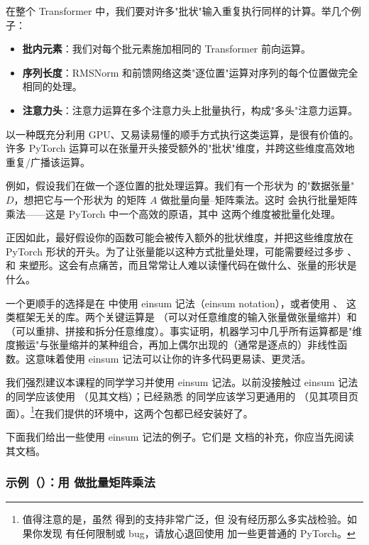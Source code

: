 在整个 Transformer 中，我们要对许多"批状"输入重复执行同样的计算。举几个例子：

\begin{itemize}
  \item \textbf{批内元素}：我们对每个批元素施加相同的 Transformer 前向运算。
  \item \textbf{序列长度}：RMSNorm 和前馈网络这类"逐位置"运算对序列的每个位置做完全相同的处理。
  \item \textbf{注意力头}：注意力运算在多个注意力头上批量执行，构成"多头"注意力运算。
\end{itemize}

以一种既充分利用 GPU、又易读易懂的顺手方式执行这类运算，是很有价值的。许多 PyTorch 运算可以在张量开头接受额外的"批状"维度，并跨这些维度高效地重复/广播该运算。

例如，假设我们在做一个逐位置的批处理运算。我们有一个形状为  的"数据张量" $D$，想把它与一个形状为  的矩阵 $A$ 做批量向量--矩阵乘法。这时  会执行批量矩阵乘法——这是 PyTorch 中一个高效的原语，其中  这两个维度被批量化处理。

正因如此，最好假设你的函数可能会被传入额外的批状维度，并把这些维度放在 PyTorch 形状的开头。为了让张量能以这种方式批量处理，可能需要经过多步 、 和  来塑形。这会有点痛苦，而且常常让人难以读懂代码在做什么、张量的形状是什么。

一个更顺手的选择是在  中使用 einsum 记法（einsum notation），或者使用 、 这类框架无关的库。两个关键运算是 （可以对任意维度的输入张量做张量缩并）和 （可以重排、拼接和拆分任意维度）。事实证明，机器学习中几乎所有运算都是"维度搬运"与张量缩并的某种组合，再加上偶尔出现的（通常是逐点的）非线性函数。这意味着使用 einsum 记法可以让你的许多代码更易读、更灵活。

我们强烈建议本课程的同学学习并使用 einsum 记法。以前没接触过 einsum 记法的同学应该使用 （见其文档）；已经熟悉  的同学应该学习更通用的 （见其项目页面）。\footnote{值得注意的是，虽然  得到的支持非常广泛，但  没有经历那么多实战检验。如果你发现  有任何限制或 bug，请放心退回使用  加一些更普通的 PyTorch。}在我们提供的环境中，这两个包都已经安装好了。

下面我们给出一些使用 einsum 记法的例子。它们是  文档的补充，你应当先阅读其文档。

\subsubsection*{示例（）：用  做批量矩阵乘法}

